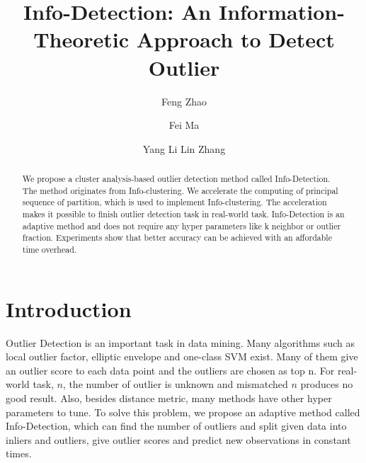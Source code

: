 \documentclass[runningheads]{llncs}
\begin{document}
%
\title{Info-Detection: An Information-Theoretic Approach to Detect Outlier}
%
%
\author{Feng Zhao \and
Fei Ma \and
Yang Li
Lin Zhang}
%
%
%
\maketitle              %
%
\begin{abstract}
We propose a cluster analysis-based outlier detection method called Info-Detection. The method originates from Info-clustering. We accelerate the computing of principal sequence of partition, which is used to implement Info-clustering. The acceleration makes it possible to finish outlier detection task in real-world task. Info-Detection is an adaptive method and does not require any hyper parameters like k neighbor or outlier fraction. Experiments show that better accuracy can be achieved with an affordable time overhead.

\end{abstract}
%
%
%
\section{Introduction}
Outlier Detection is an important task in data mining. Many algorithms such as local outlier factor, elliptic envelope and one-class SVM exist. Many of them give an outlier score to each data point and the outliers are chosen as top n. For real-world task, $n$, the number of outlier is unknown and mismatched $n$ produces no good result. Also, besides distance metric, many methods have other hyper parameters to tune. To solve this problem, we propose an adaptive method called Info-Detection, which can find the number of outliers and split given data into inliers and outliers, give outlier scores and predict new observations in constant times.
 
\end{document}
